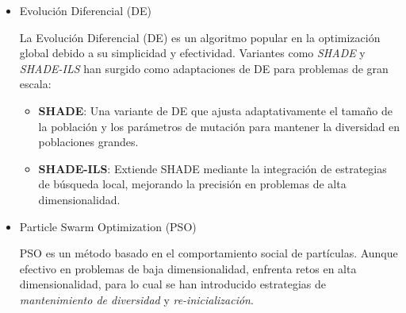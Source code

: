 \begin{itemize}

\item{Evolución Diferencial (DE)}

La Evolución Diferencial (DE) \cite{DE} es un algoritmo popular en la optimización global debido a su simplicidad y efectividad. Variantes como \textit{SHADE} y \textit{SHADE-ILS} han surgido como adaptaciones de DE para problemas de gran escala:
\begin{itemize}
    \item \textbf{SHADE}: Una variante de DE que ajusta adaptativamente el tamaño de la población y los parámetros de mutación para mantener la diversidad en poblaciones grandes.
    \item \textbf{SHADE-ILS}: Extiende SHADE mediante la integración de estrategias de búsqueda local, mejorando la precisión en problemas de alta dimensionalidad.
\end{itemize}

\item{Particle Swarm Optimization (PSO)}

PSO \cite{PSO} es un método basado en el comportamiento social de partículas. Aunque efectivo en problemas de baja dimensionalidad, enfrenta retos en alta dimensionalidad, para lo cual se han introducido estrategias de \textit{mantenimiento de diversidad} y \textit{re-inicialización}.

\end{itemize}


